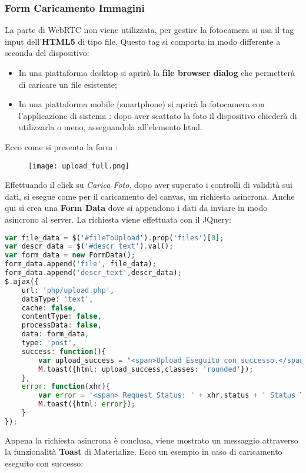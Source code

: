 \subsubsection{Form Caricamento Immagini}
La parte di WebRTC non viene utilizzata, per gestire la fotocamera si usa il tag input dell'\textbf{HTML5} di tipo file. Questo tag si comporta in modo differente a seconda del dispositivo:
\begin{itemize}
\item In una piattaforma desktop si aprirà la \textbf{file browser dialog} che permetterà di caricare un file esistente;
\item In una piattaforma mobile (smartphone) si aprirà la fotocamera con l'applicazione di sistema : dopo aver scattato la foto il dispositivo chiederà di utilizzarla o meno, assegnandola all'elemento html.
\end{itemize} 
Ecco come si presenta la form : 

\begin{figure}[h]
	\centering
	\label{fig:upload_full}
	\texttt{[image: upload\_full.png]}
\end{figure} 
Effettuando il click su \textit{Carica Foto}, dopo aver superato i controlli di validità sui dati, si esegue come per il caricamento del canvas, un richiesta asincrona.
Anche qui si crea una \textbf{Form Data} dove si appendono i dati da inviare in modo asincrono al server.
La richiesta viene effettuata con il JQuery:
\begin{lstlisting}[language=PHP]
var file_data = $('#fileToUpload').prop('files')[0];   
var descr_data = $('#descr_text').val();   
var form_data = new FormData();                  
form_data.append('file', file_data); 
form_data.append('descr_text',descr_data);                    
$.ajax({
	url: 'php/upload.php', 
	dataType: 'text',  
	cache: false,
	contentType: false,
	processData: false,
	data: form_data,                         
	type: 'post',
	success: function(){
		var upload_success = "<span>Upload Eseguito con successo.</span>";
		M.toast({html: upload_success,classes: 'rounded'});
	},
	error: function(xhr){
		var error = '<span> Request Status: ' + xhr.status + ' Status Text: ' + xhr.statusText + ' ' + xhr.responseText +'</span>'
		M.toast({html: error});  
	}
});
\end{lstlisting}
Appena la richiesta asincrona è conclusa, viene mostrato un messaggio attraverso la funzionalità \textbf{Toast} di Materialize.
Ecco un esempio in caso di caricamento eseguito con successo:

